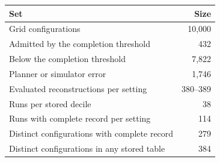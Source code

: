\begin{tabular}{@{}lr@{}}
\toprule
Set & Size \\
\midrule
Grid configurations & 10{,}000 \\
Admitted by the completion threshold & 432 \\
Below the completion threshold & 7{,}822 \\
Planner or simulator error & 1{,}746 \\
Evaluated reconstructions per setting & 380--389 \\
Runs per stored decile & 38 \\
Runs with complete record per setting & 114 \\
Distinct configurations with complete record & 279 \\
Distinct configurations in any stored table & 384 \\
\bottomrule
\end{tabular}
